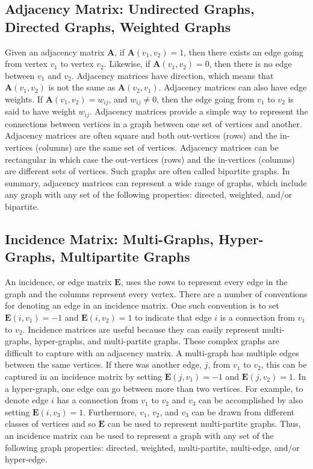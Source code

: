 \subsection{Adjacency Matrix: Undirected Graphs, Directed Graphs, Weighted Graphs}
Given an adjacency matrix $\mathbf{A}$, if $\mathbf{A}(v_1,v_2) = 1$, then there exists an edge going from vertex $v_1$ to vertex $v_2$.  Likewise, if $\mathbf{A}(v_1,v_2) = 0$, then there is no edge between $v_1$ and $v_2$.  Adjacency matrices have direction, which means that $\mathbf{A}(v_1,v_2)$ is not the same as $\mathbf{A}(v_2,v_1)$.  Adjacency matrices can also have edge weights.  If $\mathbf{A}(v_1,v_2) = w_{ij}$, and $w_{ij} \neq 0$, then the edge going from $v_1$ to $v_2$ is said to have weight $w_{ij}$.  Adjacency matrices provide a simple way to represent the connections between vertices in a graph between one set of vertices and another.  Adjacency matrices are often square and both out-vertices (rows) and the in-vertices (columns) are the same set of vertices.  Adjacency matrices can be rectangular in which case the out-vertices (rows) and the in-vertices (columns) are different sets of vertices.  Such graphs are often called bipartite graphs.  In summary, adjacency matrices can represent a wide range of graphs, which include any graph with any set of the following properties: directed, weighted, and/or bipartite.

\subsection{Incidence Matrix: Multi-Graphs, Hyper-Graphs, Multipartite Graphs}
An incidence, or edge matrix $\mathbf{E}$, uses the rows to represent every edge in the graph and the columns represent every vertex.  There are a number of conventions for denoting an edge in an incidence matrix.  One such convention is to set $\mathbf{E}(i,v_1) = -1$ and $\mathbf{E}(i,v_2) = 1$ to indicate that edge $i$ is a connection from $v_1$ to $v_2$.  Incidence matrices are useful because they can easily represent multi-graphs, hyper-graphs, and multi-partite graphs.  These complex graphs are difficult to capture with an adjacency matrix.  A multi-graph has multiple edges between the same vertices.  If there was another edge, $j$, from $v_1$ to $v_2$, this can be captured in an incidence matrix by setting $\mathbf{E}(j,v_1) = -1$ and $\mathbf{E}(j,v_2) = 1$.  In a hyper-graph, one edge can go between more than two vertices.  For example, to denote edge $i$ has a connection from $v_1$ to $v_2$ and $v_3$ can be accomplished by also setting $\mathbf{E}(i,v_3) = 1$.  Furthermore, $v_1$, $v_2$, and $v_3$ can be drawn from  different classes of vertices and so $\mathbf{E}$ can be used to represent multi-partite graphs.  Thus, an incidence matrix can be used to represent a graph with any set of the following graph properties: directed, weighted, multi-partite, multi-edge, and/or hyper-edge.

